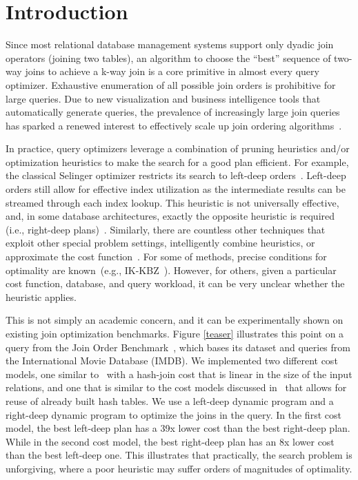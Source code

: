 \section{Introduction}\label{intro}\sloppy
Since most relational database management systems support only dyadic join operators (joining two tables), an algorithm to choose the ``best'' sequence of two-way joins to achieve a k-way join is a core primitive in almost every query optimizer.
Exhaustive enumeration of all possible join orders is prohibitive for large queries.
Due to new visualization and business intelligence tools that automatically generate queries, the prevalence of increasingly large join queries has sparked a renewed interest to effectively scale up join ordering algorithms~\cite{neumann2018adaptive}. 

In practice, query optimizers leverage a combination of pruning heuristics and/or optimization heuristics to make the search for a good plan efficient.
For example, the classical Selinger optimizer restricts its search to left-deep orders~\cite{selinger1979access}.
Left-deep orders still allow for effective index utilization as the intermediate results can be streamed through each index lookup. 
This heuristic is not universally effective, and, in some database architectures, exactly the opposite heuristic is required (i.e., right-deep plans)~\cite{gerber1986data}.
Similarly, there are countless other techniques that exploit other special problem settings, intelligently combine heuristics, or approximate the cost function~\cite{swami1993polynomial,steinbrunn1997heuristic,galindo2008optimizing,ziane1993parallel}. 
For some of methods, precise conditions for optimality are known~(e.g., IK-KBZ~\cite{krishnamurthy1986optimization}). However, for others, given a particular cost function, database, and query workload, it can be very unclear whether the heuristic applies. 

This is not simply an academic concern, and it can be experimentally shown on existing join optimization benchmarks.
Figure \ref{teaser} illustrates this point on a query from the Join Order Benchmark~\cite{leis2015good}, which bases its dataset and queries from the International Movie Database (IMDB). We implemented two different cost models, one similar to~\cite{leis2015good} with a hash-join cost that is linear in the size of the input relations, and one that is similar to the cost models discussed in~\cite{ziane1993parallel} that allows for reuse of already built hash tables.
We use a left-deep dynamic program and a right-deep dynamic program to optimize the joins in the query.
In the first cost model, the best left-deep plan has a 39x lower cost than the best right-deep plan. While in the second cost model, the best right-deep plan has an 8x lower cost than the best left-deep one.
This illustrates that practically, the search problem is unforgiving, where a poor heuristic may suffer orders of magnitudes of optimality.


